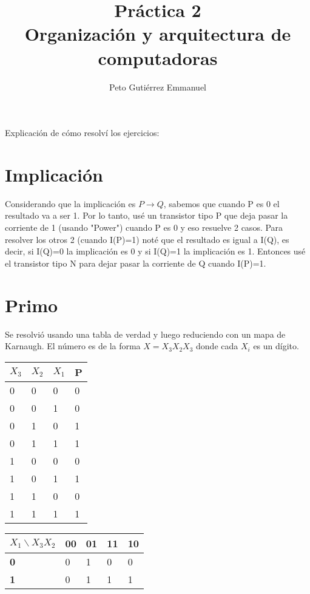\documentclass{article}
\title{Práctica 2 \\ Organización y arquitectura de computadoras}
\author{Peto Gutiérrez Emmanuel}
\begin{document}
\maketitle

Explicación de cómo resolví los ejercicios:

\section{Implicación}

Considerando que la implicación es $P \rightarrow Q$, sabemos que cuando P es 0 el resultado va a ser 1. Por lo tanto, usé un transistor tipo P que deja pasar la corriente de 1 (usando "Power") cuando P es 0 y eso resuelve 2 casos. Para resolver los otros 2 (cuando I(P)=1) noté que el resultado es igual a I(Q), es decir, si I(Q)=0 la implicación es 0 y si I(Q)=1 la implicación es 1. Entonces usé el transistor tipo N para dejar pasar la corriente de Q cuando I(P)=1.

\section{Primo}

Se resolvió usando una tabla de verdad y luego reduciendo con un mapa de Karnaugh. El número es de la forma $X=X_{3}X_{2}X_{3}$ donde cada $X_{i}$ es un dígito.

\begin{table}[htbp]
\begin{center}
\begin{tabular}{|l|l|l|l|}
\hline
\textbf{$X_{3}$} & \textbf{$X_{2}$} & \textbf{$X_{1}$} & \textbf{P} \\ \hline
0 & 0 & 0 & 0 \\ \hline
0 & 0 & 1 & 0 \\ \hline
0 & 1 & 0 & 1 \\ \hline
0 & 1 & 1 & 1 \\ \hline
1 & 0 & 0 & 0 \\ \hline
1 & 0 & 1 & 1 \\ \hline
1 & 1 & 0 & 0 \\ \hline
1 & 1 & 1 & 1 \\ \hline
\end{tabular}
\end{center}
\end{table}

\begin{table}[htbp]
\begin{center}
\begin{tabular}{|l|l|l|l|l|}
\hline
$X_{1} \backslash X_{3}X_{2}$ & \textbf{00} & \textbf{01} & \textbf{11} & \textbf{10} \\ \hline
\textbf{0} & 0 & 1 & 0 & 0 \\ \hline
\textbf{1} & 0 & 1 & 1 & 1 \\ \hline
\end{tabular}
\end{center}
\end{table}
\end{document}
